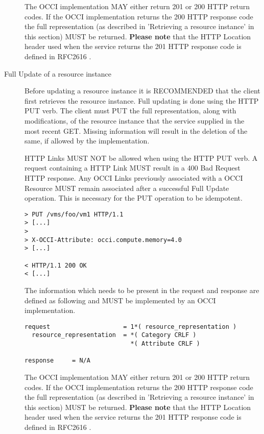 \documentclass[10pt,a4paper]{article}
\begin{document}
\begin{description}
    The OCCI implementation MAY either return 201 or 200 HTTP return
    codes. If the OCCI implementation returns the 200 HTTP response
    code the full representation (as described in 'Retrieving a
    resource instance' in this section) MUST be
    returned. \textbf{Please note} that the HTTP Location header used
    when the service returns the 201 HTTP response code is defined in
    RFC2616 \cite{rfc2616}.
    
  \item[Full Update of a resource instance] Before updating a resource
    instance it is RECOMMENDED that the client first retrieves the
    resource instance. Full updating is done using the HTTP PUT verb. The
    client must PUT the full representation, along with modifications,
    of the resource instance that the service supplied in the most
    recent GET. Missing information will result in the deletion of the
    same, if allowed by the implementation.

    HTTP Links MUST NOT be allowed when using the HTTP PUT verb. A request
    containing a HTTP Link MUST result in a 400 Bad Request HTTP response.
    Any OCCI Links previously associated with a OCCI Resource MUST remain
    associated after a successful Full Update operation. This is necessary
    for the PUT operation to be idempotent.

    

\begin{verbatim}
> PUT /vms/foo/vm1 HTTP/1.1
> [...]
> 
> X-OCCI-Attribute: occi.compute.memory=4.0
> [...]
 
< HTTP/1.1 200 OK
< [...]
\end{verbatim}

    The information which needs to be present in the request and
    response are defined as following and MUST be implemented by an
    OCCI implementation.

\begin{verbatim}
request                    = 1*( resource_representation )
  resource_representation  = *( Category CRLF )
                             *( Attribute CRLF )

response     = N/A
\end{verbatim}

    The OCCI implementation MAY either return 201 or 200 HTTP return
    codes. If the OCCI implementation returns the 200 HTTP response
    code the full representation (as described in 'Retrieving a
    resource instance' in this section) MUST be
    returned. \textbf{Please note} that the HTTP Location header used
    when the service returns the 201 HTTP response code is defined in
    RFC2616 \cite{rfc2616}.
    

\end{description}
\end{document}
